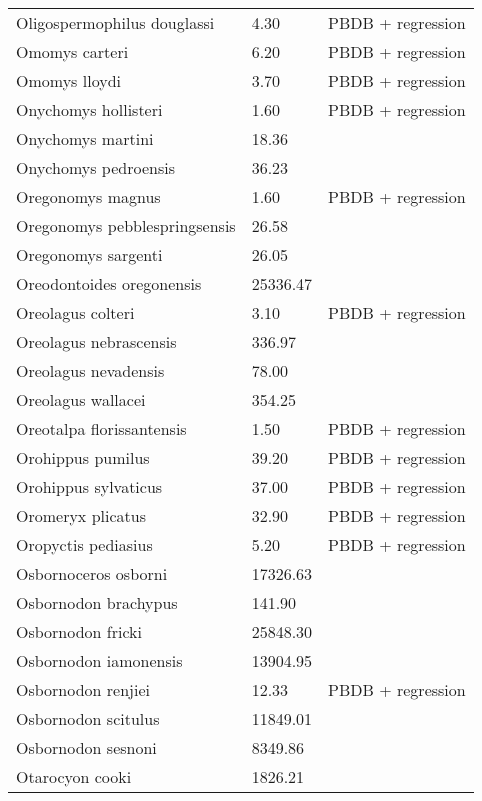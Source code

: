 \documentclass{article}
\begin{document}
\begin{center}
\begin{longtable}{p{} p{} p{}}
    Oligospermophilus douglassi & 4.30 & PBDB + regression \\ 
    Omomys carteri & 6.20 & PBDB + regression \\ 
    Omomys lloydi & 3.70 & PBDB + regression \\ 
    Onychomys hollisteri & 1.60 & PBDB + regression \\ 
    Onychomys martini & 18.36 & \cite{Tomiya2013} \\ 
    Onychomys pedroensis & 36.23 & \cite{Tomiya2013} \\ 
    Oregonomys magnus & 1.60 & PBDB + regression \\ 
    Oregonomys pebblespringsensis & 26.58 & \cite{Tomiya2013} \\ 
    Oregonomys sargenti & 26.05 & \cite{Tomiya2013} \\ 
    Oreodontoides oregonensis & 25336.47 & \cite{Tomiya2013} \\ 
    Oreolagus colteri & 3.10 & PBDB + regression \\ 
    Oreolagus nebrascensis & 336.97 & \cite{Tomiya2013} \\ 
    Oreolagus nevadensis & 78.00 & \cite{McKenna2011} \\ 
    Oreolagus wallacei & 354.25 & \cite{Tomiya2013} \\ 
    Oreotalpa florissantensis & 1.50 & PBDB + regression \\ 
    Orohippus pumilus & 39.20 & PBDB + regression \\ 
    Orohippus sylvaticus & 37.00 & PBDB + regression \\ 
    Oromeryx plicatus & 32.90 & PBDB + regression \\ 
    Oropyctis pediasius & 5.20 & PBDB + regression \\ 
    Osbornoceros osborni & 17326.63 & \cite{Tomiya2013} \\ 
    Osbornodon brachypus & 141.90 & \cite{Chester2012} \\ 
    Osbornodon fricki & 25848.30 & \cite{Tomiya2013} \\ 
    Osbornodon iamonensis & 13904.95 & \cite{Tomiya2013} \\ 
    Osbornodon renjiei & 12.33 & PBDB + regression \\ 
    Osbornodon scitulus & 11849.01 & \cite{Tomiya2013} \\ 
    Osbornodon sesnoni & 8349.86 & \cite{Tomiya2013} \\ 
    Otarocyon cooki & 1826.21 & \cite{Tomiya2013} \\ 

\end{longtable}
\end{center}
\end{document}
